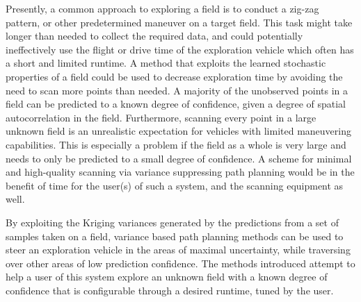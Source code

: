 Presently, a common approach to exploring a field is to conduct a zig-zag pattern, or other predetermined maneuver on a target field. This task might take longer than needed to collect the required data, and could potentially ineffectively use the flight or drive time of the exploration vehicle which often has a short and limited runtime. A method that exploits the learned stochastic properties of a field could be used to decrease exploration time by avoiding the need to scan more points than needed. A majority of the unobserved points in a field can be predicted to a known degree of confidence, given a degree of spatial autocorrelation in the field. Furthermore, scanning every point in a large unknown field is an unrealistic expectation for vehicles with limited maneuvering capabilities. This is especially a problem if the field as a whole is very large and needs to only be predicted to a small degree of confidence. A scheme for minimal and high-quality scanning via variance suppressing path planning would be in the benefit of time for the user(s) of such a system, and the scanning equipment as well.

By exploiting the Kriging variances generated by the predictions from a set of samples taken on a field, variance based path planning methods can be used to steer an exploration vehicle in the areas of maximal uncertainty, while traversing over other areas of low prediction confidence. The methods introduced attempt to help a user of this system explore an unknown field with a known degree of confidence that is configurable through a desired runtime, tuned by the user.




